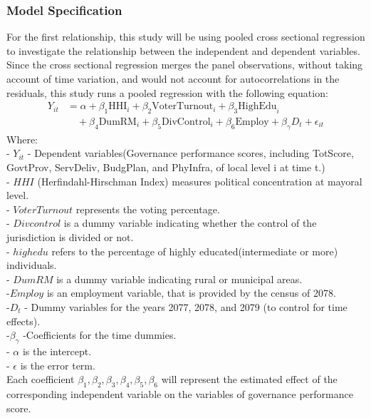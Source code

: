 \subsubsection{Model Specification}
For the first relationship, this study will be using  pooled cross sectional regression to investigate the relationship between the independent and dependent variables. Since the cross sectional regression merges the panel observations, without taking account of time variation, and would not account for autocorrelations in the residuals, this study runs a pooled regression with the following equation:
\begin{align}
Y_{it} & = \alpha + \beta_1 \text{HHI}_i + \beta_2 \text{VoterTurnout}_i + \beta_3 \text{HighEdu}_i \nonumber \\ &\quad + \beta_4 \text{DumRM}_i + \beta_5 \text{DivControl}_i + \beta_6\text{Employ} + \beta_\gamma D_t + \epsilon_{it} 
\end{align}
Where:\\
- \(Y_{it}\) - Dependent variables(Governance performance scores, including TotScore, GovtProv, ServDeliv, BudgPlan, and PhyInfra,  of local level  i at time  t.)\\
- \(HHI\) (Herfindahl-Hirschman Index) measures political concentration at mayoral level.\\
- \(VoterTurnout\) represents the voting percentage.\\
- \(Divcontrol\) is a dummy variable indicating whether the control of the jurisdiction is divided or not.\\
- \(highedu\) refers to the percentage of highly educated(intermediate or more) individuals.\\
- \(DumRM\) is a dummy variable indicating rural or municipal areas.\\
-\(Employ\) is an employment variable, that is provided by the census of 2078.\\
-\(D_t\) - Dummy variables for the years 2077, 2078, and 2079 (to control for time effects).\\
-\(\beta_\gamma \) -Coefficients for the time dummies.\\
- \(\alpha\) is the intercept.\\
- \(\epsilon\) is the error term.\\
Each coefficient \(\beta_1, \beta_2, \beta_3, \beta_4, \beta_5, \beta_6\) will represent the estimated effect of the corresponding independent variable on the variables of governance performance score.\par
